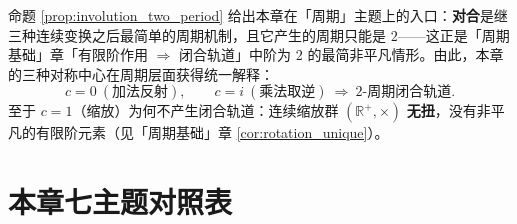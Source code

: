 \begin{remark}[与「周期」主题的接口]\label{rem:vector_two_period_interface}
命题 \ref{prop:involution_two_period} 给出本章在「周期」主题上的入口：\textbf{对合}是继三种连续变换之后最简单的周期机制，且它产生的周期只能是 $2$——这正是「周期基础」章「有限阶作用 $\Rightarrow$ 闭合轨道」中阶为 $2$ 的最简非平凡情形。由此，本章的三种对称中心在周期层面获得统一解释：
\[
c=0\ (\text{加法反射}),\qquad c=i\ (\text{乘法取逆})\ \Longrightarrow\ \text{2-周期闭合轨道}.
\]
至于 $c=1$（缩放）为何不产生闭合轨道：连续缩放群 $(\mathbb{R}^+,\times)$ \textbf{无扭}，没有非平凡的有限阶元素（见「周期基础」章 \cref{cor:rotation_unique}）。
\end{remark}


\section*{本章七主题对照表}

